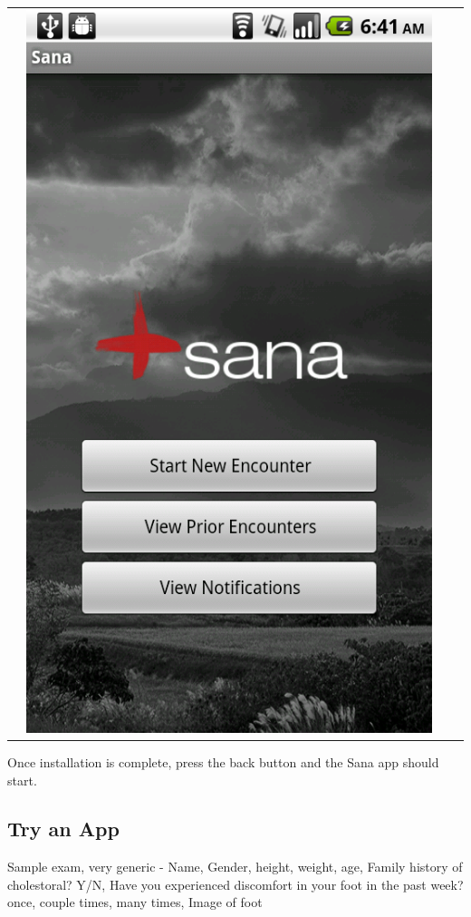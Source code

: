\documentclass[a4paper,10pt]{article}
\begin{document}
\begin{tabular}{ c c c c }
&\includegraphics[scale=0.2,keepaspectratio=true]{sana_splash.png}
\end{tabular}

\noindent Once installation is complete, press the back button and the Sana app
should start. 
\newpage

\subsection{Try an App}
Sample exam, very generic
 - Name, Gender, height, weight, age, Family history of cholestoral? Y/N, Have 
you experienced discomfort in your foot in the past week? once, couple times, 
many times, Image of foot
\end{document}
